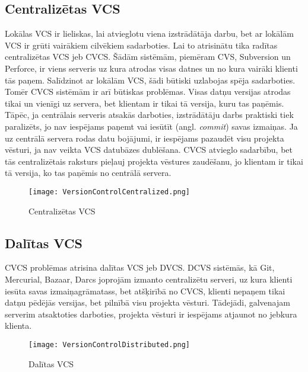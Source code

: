 \subsection{Centralizētas VCS}
Lokālas VCS ir lieliskas, lai atvieglotu viena izstrādātāja darbu, bet ar lokālām VCS ir grūti vairākiem cilvēkiem sadarboties. Lai to atrisinātu tika radītas centralizētas VCS jeb CVCS. Šādām sistēmām, piemēram CVS, Subversion un Perforce, ir viens serveris uz kura atrodas visas datnes un no kura vairāki klienti tās paņem. Salīdzinot ar lokālām VCS, šādi būtiski uzlabojas spēja sadarboties. Tomēr CVCS sistēmām ir arī būtiskas problēmas. Visas datņu versijas atrodas tikai un vienīgi uz servera, bet klientam ir tikai tā versija, kuru tas paņēmis. Tāpēc, ja centrālais serveris atsakās darboties, izstrādātāju darbs praktiski tiek paralizēts, jo nav iespējams paņemt vai iesūtīt (angl. \textit{commit}) savas izmaiņas. Ja uz centrālā servera rodas datu bojājumi, ir iespējams pazaudēt visu projekta vēsturi, ja nav veikta VCS datubāzes dublēšana.
CVCS atvieglo sadarbību, bet tās centralizētais raksturs pieļauj projekta vēstures zaudēšanu, jo klientam ir tikai tā versija, ko tas paņēmis no centrālā servera.
\begin{figure}[H]%
	\centering
	\captionsetup{justification=centering}
	\texttt{[image: VersionControlCentralized.png]}
	\caption{Centralizētas VCS}
	\label{fig:VersionControlCentralized}
\end{figure}

\subsection{Dalītas VCS}
CVCS problēmas atrisina dalītas VCS jeb DVCS. DCVS sistēmās, kā Git, Mercurial, Bazaar, Darcs joprojām izmanto centralizētu serveri, uz kura klienti iesūta savas izmaiņagrāmatass, bet atšķirībā no CVCS, klienti nepaņem tikai datņu pēdējās versijas, bet pilnībā visu projekta vēsturi. Tādejādi, galvenajam serverim atsaktoties darboties, projekta vēsturi ir iespējams atjaunot no jebkura klienta.
\begin{figure}[H]%
	\centering
	\captionsetup{justification=centering}
	\texttt{[image: VersionControlDistributed.png]}
	\caption{Dalītas VCS}
	\label{fig:VersionControlDistributed}
\end{figure}

